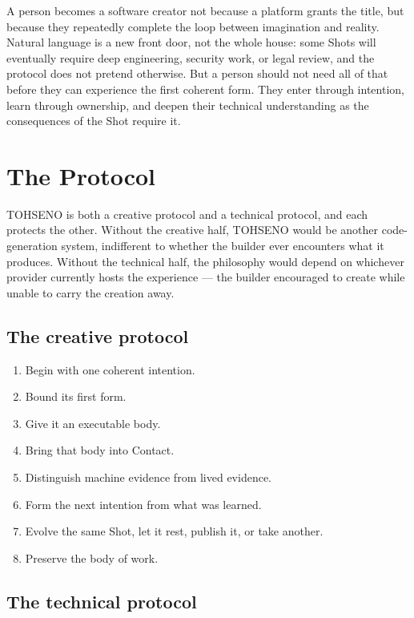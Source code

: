 \documentclass[11pt]{article}
\newcommand{\TOH}{TOHSENO}
\begin{document}
A person becomes a software creator not because a platform grants the
title, but because they repeatedly complete the loop between imagination
and reality. Natural language is a new front door, not the whole house:
some Shots will eventually require deep engineering, security work, or
legal review, and the protocol does not pretend otherwise. But a person
should not need all of that before they can experience the first
coherent form. They enter through intention, learn through ownership,
and deepen their technical understanding as the consequences of the Shot
require it.

\section{The Protocol}

\TOH{} is both a creative protocol and a technical protocol, and each
protects the other. Without the creative half, \TOH{} would be another
code-generation system, indifferent to whether the builder ever
encounters what it produces. Without the technical half, the philosophy
would depend on whichever provider currently hosts the experience ---
the builder encouraged to create while unable to carry the creation
away.

\subsection{The creative protocol}

\begin{enumerate}
\item Begin with one coherent intention.
\item Bound its first form.
\item Give it an executable body.
\item Bring that body into Contact.
\item Distinguish machine evidence from lived evidence.
\item Form the next intention from what was learned.
\item Evolve the same Shot, let it rest, publish it, or take another.
\item Preserve the body of work.
\end{enumerate}

\subsection{The technical protocol}
\end{document}
